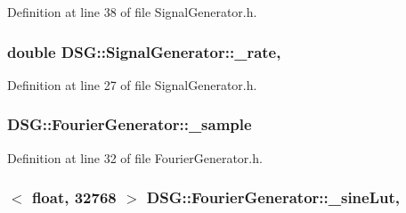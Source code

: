 Definition at line 38 of file Signal\+Generator.\+h.

\hypertarget{classDSG_1_1SignalGenerator_aa10f6c85d9adee901139ea7fb346f39d}{
\subsubsection[{\+\_\+rate}]{\setlength{\rightskip}{0pt plus 5cm}double D\+S\+G\+::\+Signal\+Generator\+::\+\_\+rate\hspace{0.3cm}{\ttfamily [protected]}, {\ttfamily [inherited]}}}\label{classDSG_1_1SignalGenerator_aa10f6c85d9adee901139ea7fb346f39d}


Definition at line 27 of file Signal\+Generator.\+h.

\hypertarget{classDSG_1_1FourierGenerator_ab96bed1cd59c42e82a689036e5c62bef}{
\subsubsection[{\+\_\+sample}]{ D\+S\+G\+::\+Fourier\+Generator\+::\+\_\+sample\hspace{0.3cm}{\ttfamily [protected]}}}\label{classDSG_1_1FourierGenerator_ab96bed1cd59c42e82a689036e5c62bef}


Definition at line 32 of file Fourier\+Generator.\+h.

\hypertarget{classDSG_1_1FourierGenerator_a1ae5fb243ce05e638bdf0dec8bde7426}{
\subsubsection[{\+\_\+sine\+Lut}]{$<$ float, 32768 $>$ D\+S\+G\+::\+Fourier\+Generator\+::\+\_\+sine\+Lut\hspace{0.3cm}{\ttfamily [static]}, {\ttfamily [protected]}}}\label{classDSG_1_1FourierGenerator_a1ae5fb243ce05e638bdf0dec8bde7426}


